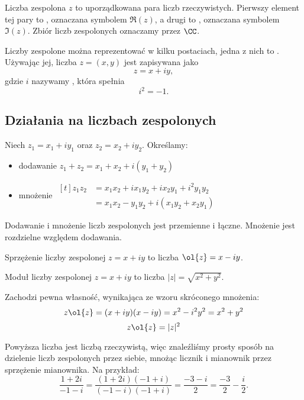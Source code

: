 \begin{definition}
    Liczba zespolona $z$ to uporządkowana para liczb rzeczywistych. Pierwszy element tej pary to , oznaczana symbolem $\Re(z)$, a drugi to , oznaczana symbolem $\Im(z)$. Zbiór liczb zespolonych oznaczamy przez $\CC$.
\end{definition}

Liczby zespolone można reprezentować w kilku postaciach, jedna z nich to . Używając jej, liczba $z = (x, y)$ jest zapisywana jako
$$ z = x + iy, $$
gdzie $i$ nazywamy , która spełnia
$$ i^2 = -1. $$

\subsection{Działania na liczbach zespolonych}
Niech $z_1 = x_1 + iy_1$ oraz $z_2 = x_2 + iy_2$. Określamy:
\begin{itemize}
    \item dodawanie $z_1 + z_2 = x_1 + x_2 + i(y_1 + y_2)$
    \item mnożenie $\begin{aligned}[t] z_1z_2 &= x_1x_2 + ix_1y_2 + ix_2y_1 + i^2y_1y_2 \\ &= x_1x_2 - y_1y_2 + i(x_1y_2 + x_2y_1)\end{aligned}$
\end{itemize}

\begin{corollary}
    Dodawanie i mnożenie liczb zespolonych jest przemienne i łączne. Mnożenie jest rozdzielne względem dodawania.
\end{corollary}

\begin{definition}
    Sprzężenie liczby zespolonej $z = x + iy$ to liczba $\ol{z} = x - iy$.
\end{definition}

\begin{definition}
    \label{d:magnitude}
    Moduł liczby zespolonej $z = x + iy$ to liczba $|z| = \sqrt{x^2 + y^2}$.
\end{definition}

Zachodzi pewna własność, wynikająca ze wzoru skróconego mnożenia:
$$ z\ol{z} = (x + iy)(x - iy) = x^2 - i^2y^2 = x^2 + y^2 $$
\begin{equation}
    z\ol{z} = |z|^2
\end{equation}

Powyższa liczba jest liczbą rzeczywistą, więc znaleźliśmy prosty sposób na dzielenie liczb zespolonych przez siebie, mnożąc licznik i mianownik przez sprzężenie mianownika. Na przykład:
$$ \frac{1 + 2i}{-1 - i} = \frac{(1 + 2i)(-1 + i)}{(-1 - i)(-1 + i)} = \frac{-3 -i}{2} = \frac{-3}{2} - \frac{i}{2}. $$

